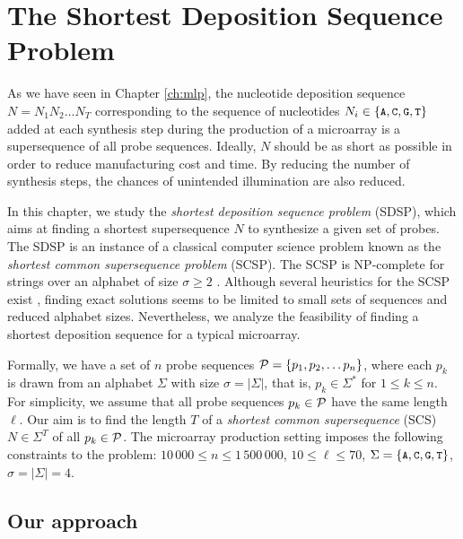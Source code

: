 \chapter{The Shortest Deposition Sequence Problem}
\label{ch:scs}

As we have seen in Chapter \ref{ch:mlp}, the nucleotide deposition sequence
$N = N_{1} N_{2} \ldots N_{T}$ corresponding to the sequence of nucleotides
$N_i \in \{\text{\small{\tt A}}, \text{\small{\tt C}}, \text{\small{\tt G}}, \text{\small{\tt T}}\}$ added at each synthesis step during the
production of a microarray is a supersequence of all probe sequences. Ideally,
$N$ should be as short as possible in order to reduce manufacturing cost and
time. By reducing the number of synthesis steps, the chances of unintended
illumination are also reduced.

In this chapter, we study the \emph{shortest deposition sequence problem}
(SDSP), which aims at finding a shortest supersequence $N$ to synthesize a
given set of probes. The SDSP is an instance of a classical computer science
problem known as the \emph{shortest common supersequence problem} (SCSP). The
SCSP is NP-complete for strings over an alphabet of size $\sigma \geq 2$
\citep{Raiha1981}. Although several heuristics for the SCSP exist
\citep[for a survey, see][]{Fraser1995}, finding exact solutions seems to be
limited to small sets of sequences and reduced alphabet sizes. Nevertheless, we
analyze the feasibility of finding a shortest deposition sequence for a
typical microarray.

Formally, we have a set of $n$ probe sequences
${\mathcal{P}} = \{p_1, p_2, \ldots p_n \}$, where each $p_k$ is drawn from an alphabet
$\Sigma$ with size $\sigma = | \Sigma |$, that is, $p_k \in \Sigma^{\ast}$ for
$1 \leq k \leq n$. For simplicity, we assume that all probe sequences
$p_k \in {\mathcal{P}}$ have the same length $\ell$. Our aim is to find the length $T$
of a \emph{shortest common supersequence} (SCS) $N \in \Sigma^T$ of all
$p_k \in {\mathcal{P}}$. The microarray production setting imposes the following
constraints to the problem: $10\,000 \leq n \leq 1\,500\,000$,
$10 \leq \ell \leq 70$, $\Sigma = \{\text{\small{\tt A}},\text{\small{\tt C}},\text{\small{\tt G}},\text{\small{\tt T}}\}$,
$\sigma = | \Sigma | = 4$.

\section{Our approach}
\label{sec:scs_ourapproach}

